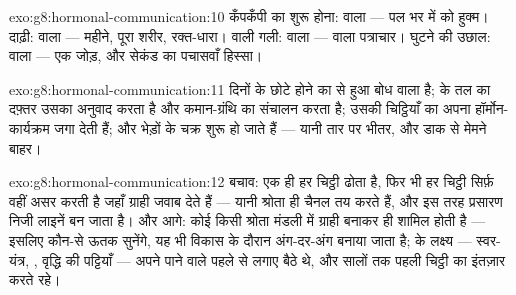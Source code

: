 \begin{solution}{exo:g8:hormonal-communication:10}
कँपकँपी का शुरू होना:  वाला --- पल भर में  को हुक्म।
दाढ़ी:  वाला --- महीने, पूरा शरीर, रक्त-धारा।  वाली गली:
 वाला ---  वाला पत्राचार। घुटने की उछाल:  वाला
--- एक जोड़, और सेकंड का पचासवाँ हिस्सा।
\end{solution}

\begin{solution}{exo:g8:hormonal-communication:11}
दिनों के छोटे होने का  से हुआ बोध  वाला है;  के तल
का दफ़्तर उसका अनुवाद करता है और कमान-ग्रंथि का संचालन करता है; उसकी
चिट्ठियाँ  का अपना हॉर्मोन-कार्यक्रम जगा देती हैं; और भेड़ों के
चक्र शुरू हो जाते हैं --- यानी तार पर  भीतर, और डाक से मेमने
बाहर।
\end{solution}

\begin{solution}{exo:g8:hormonal-communication:12}
बचाव: एक ही  हर चिट्ठी ढोता है, फिर भी हर चिट्ठी सिर्फ़ वहीं असर
करती है जहाँ ग्राही जवाब देते हैं --- यानी श्रोता ही चैनल तय करते हैं,
और इस तरह प्रसारण निजी लाइनें बन जाता है। और आगे: कोई  किसी श्रोता
मंडली में ग्राही बनाकर ही शामिल होती है --- इसलिए कौन-से ऊतक सुनेंगे,
यह भी विकास के दौरान अंग-दर-अंग बनाया जाता है;  के लक्ष्य ---
स्वर-यंत्र, , वृद्धि की पट्टियाँ --- अपने पाने वाले पहले से लगाए
बैठे थे, और सालों तक पहली चिट्ठी का इंतज़ार करते रहे।
\end{solution}

